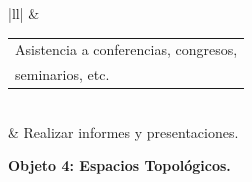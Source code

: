 \begin{table}[H]
\begin{tabular}{|ll|}
 & \begin{tabular}[c]{@{}l@{}}Asistencia a conferencias, congresos,\\ seminarios, etc.\end{tabular} \\
 & Realizar informes y presentaciones. \\ \hline
\end{tabular}
\end{table}

\begin{center}
    \textbf{Objeto 4: Espacios Topológicos.}
\end{center}

